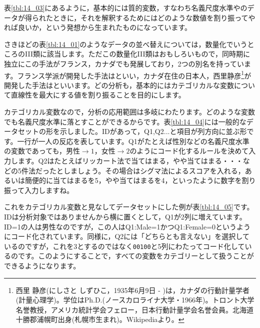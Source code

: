 \documentclass{ltjsbook}
\begin{document}
表\ref{tbl:14_03}にあるように，基本的には質的変数，すなわち名義尺度水準やのデータが得られたときに，それを解釈するためにはどのような数値を割り振ってやれば良いか，という発想から生まれたものになっています。

さきほどの表\ref{tbl:14_01}のようなデータの並べ替えについては，数量化でいうところのIII類に該当します。ただこの数量化III類はおもしろいもので，同時期に独立にこの手法がフランス，カナダでも発展しており，2つの別名を持っています。フランス学派が開発した手法はといい，カナダ在住の日本人，西里静彦\footnote{西里 静彦(にしさと しずひこ，1935年6月9日 - )は，カナダの行動計量学者(計量心理学)。学位はPh.D.(ノースカロライナ大学・1966年)。トロント大学名誉教授，アメリカ統計学会フェロー，日本行動計量学会名誉会員。北海道十勝郡浦幌町出身(札幌市生まれ)。Wikipediaより。}が開発した手法はといいます。どの分析も，基本的にはカテゴリカルな変数について直線性を最大にする値を割り振ることを目的にします。

カテゴリカル変数なので，分析の応用範囲は多岐にわたります。どのような変数でも名義尺度水準に落とすことができるからです。表\ref{tbl:14_04}には一般的なデータセットの形を示しました。IDがあって，Q1,Q2...と項目が列方向に並ぶ形です。一行が一人の反応を表しています。Q1がたとえば性別などの名義尺度水準の変数であっても，男性$\to1$，女性$\to2$のようにコード化するルールを決めて入力します。Q2はたとえばリッカート法で当てはまる，やや当てはまる・・・などの5件法だったとしましょう。その場合はシグマ法によるスコアを入れる，あるいは簡便的に当てはまるを5，やや当てはまるを4，といったように数字を割り振って入力しますね。

これをカテゴリカル変数と見なしてデータセットにした例が表\ref{tbl:14_05}です。IDは分析対象ではありませんから横に置くとして，Q1が2列に増えています。ID=1の人は男性なのですが，この人はQ1:Male=1かつQ1:Female=0というようにコード化されています。同様に，Q2には「どちらとも言えない」を選択しているのですが，これを3とするのではなく\texttt{00100}と5列にわたってコード化しているのです。このようにすることで，すべての変数をカテゴリーとして扱うことができるようになります。
\end{document}

